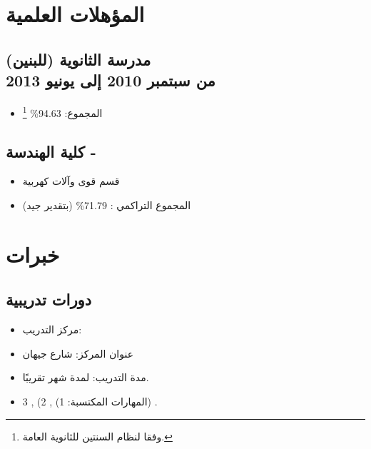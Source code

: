 \section[\large\faGraduationCap]{المؤهلات العلمية}
\subsection[\faSchool]{مدرسة \protect{}
الثانوية (للبنين)
 \\ من سبتمبر 2010 إلى يونيو 2013}
	\begin{itemize}[nosep,leftmargin=*] 
		\item المجموع: 94.63\% \footnote{وفقا لنظام السنتين للثانوية العامة.}
	\end{itemize}
\subsection[\faUniversity]{كلية الهندسة - \protect{} \\ \protect{}}
	\begin{itemize}[nosep,leftmargin=*] 
		\item قسم قوى وآلات كهربية 
		\item المجموع التراكمي : 71.79\% (بتقدير جيد)
	\end{itemize}
\section[\faChartLine]{خبرات}
\subsection{دورات تدريبية}
\begin{tcolorbox}[enhanced,bidibreakable,title={دورة التحكم الآلي \LR{ِAutomation}  \\ من 28 يوليو حتى ---}]
	\begin{itemize}[nosep,leftmargin=*,align=left]
		\item مركز التدريب: 
		\item عنوان المركز: شارع جيهان
		\item مدة التدريب: لمدة شهر تقريبًا.
		\item المهارات المكتسبة: 1) 
				,
				2) , 3) .
	\end{itemize}
\end{tcolorbox}
